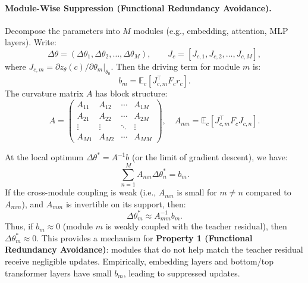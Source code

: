 \documentclass{article}
\begin{document}
\paragraph{Module-Wise Suppression (Functional Redundancy Avoidance).}
Decompose the parameters into \(M\) modules (e.g., embedding, attention, MLP layers). Write:
\begin{equation}
\Delta\theta = (\Delta\theta_1, \Delta\theta_2, \dots, \Delta\theta_M), \qquad
J_c = [J_{c,1}, J_{c,2}, \dots, J_{c,M}],
\end{equation}
where \(J_{c,m} = \partial z_{\theta}(c)/\partial \theta_m|_{\theta_0}\).  
Then the driving term for module \(m\) is:
\begin{equation}
b_m = \mathbb{E}_c[ J_{c,m}^{\top} F_c r_c ].
\end{equation}
The curvature matrix \(A\) has block structure:
\begin{equation}
A = \begin{pmatrix}
A_{11} & A_{12} & \cdots & A_{1M} \\
A_{21} & A_{22} & \cdots & A_{2M} \\
\vdots  & \vdots  & \ddots & \vdots  \\
A_{M1} & A_{M2} & \cdots & A_{MM}
\end{pmatrix},
\quad A_{mn} = \mathbb{E}_c[J_{c,m}^{\top} F_c J_{c,n}].
\end{equation}

At the local optimum \(\Delta\theta^* = A^{-1}b\) (or the limit of gradient descent), we have:
\begin{equation}
\sum_{n=1}^{M} A_{mn} \Delta\theta_n^* = b_m.
\end{equation}
If the cross-module coupling is weak (i.e., \(A_{mn}\) is small for \(m\ne n\) compared to \(A_{mm}\)), and \(A_{mm}\) is invertible on its support, then:
\begin{equation}
\Delta\theta_m^* \approx A_{mm}^{-1} b_m.
\end{equation}
Thus, if \(b_m \approx 0\) (module \(m\) is weakly coupled with the teacher residual), then \(\Delta\theta_m^* \approx 0\). This provides a mechanism for \textbf{Property 1 (Functional Redundancy Avoidance)}: modules that do not help match the teacher residual receive negligible updates. Empirically, embedding layers and bottom/top transformer layers have small \(b_m\), leading to suppressed updates.
\end{document}
